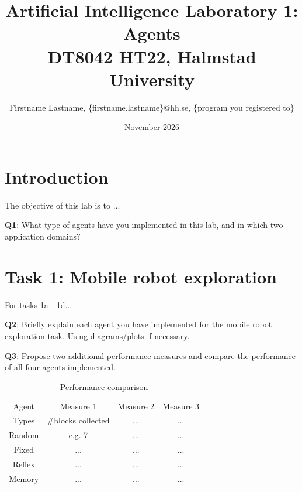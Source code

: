 \documentclass{article}
\title{Artificial Intelligence Laboratory 1: Agents \\ DT8042 HT22, Halmstad University}
\author{Firstname Lastname,  \{firstname.lastname\}@hh.se, \{program you registered to\}}
\date{November 2026}
\begin{document}
\maketitle

\section*{Introduction}

The objective of this lab is to ...

\begin{tcolorbox}
\textbf{Q1}: What type of agents have you implemented in this lab, and in which two application domains?
\end{tcolorbox}

\section*{Task 1: Mobile robot exploration}

For tasks 1a - 1d...

\begin{tcolorbox}
\textbf{Q2}: Briefly explain each agent you have implemented for the mobile robot exploration task. Using diagrams/plots if necessary.
\end{tcolorbox}

\begin{tcolorbox}
\textbf{Q3}: Propose two additional performance measures and compare the performance of all four agents implemented. 
\end{tcolorbox}


\begin{table}[h]
\vspace{1cm}
\begin{center}
\begin{tabular}{cccc}
\toprule
 Agent & Measure 1 & Measure 2  & Measure 3 \\
 Types & \#blocks collected & ... & ... \\\midrule
Random & e.g. 7 & ... & ...  \\
Fixed & ... & ... & ... \\
Reflex & ... & ... & ...  \\
Memory & ... & ... & ...   \\
\bottomrule
\end{tabular}
\end{center}
\caption{Performance comparison}
\label{tab:comparison}
\end{table}
\end{document}
